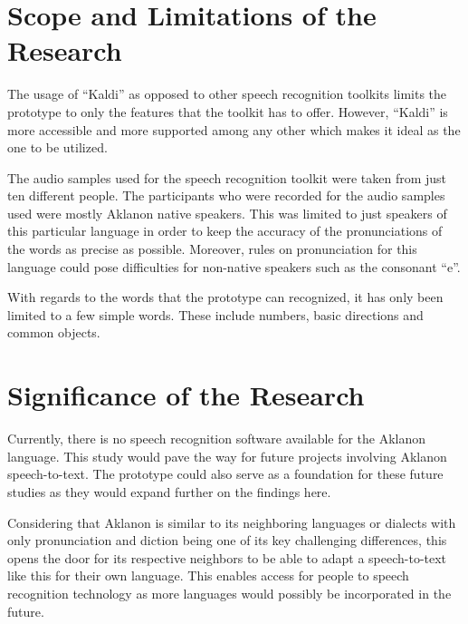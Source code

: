 \section{Scope and Limitations of the Research}

The usage of “Kaldi” as opposed to other speech recognition toolkits limits the prototype to only the features that the toolkit has to offer. However, “Kaldi” is more accessible and more supported among any other which makes it ideal as the one to be utilized.

The audio samples used for the speech recognition toolkit were taken from just ten different people. The participants who were recorded for the audio samples used were mostly Aklanon native speakers. This was limited to just speakers of this particular language in order to keep the accuracy of the pronunciations of the words as precise as possible. Moreover, rules on pronunciation for this language could pose difficulties for non-native speakers such as the consonant “e”. 

With regards to the words that the prototype can recognized, it has only been limited to a few simple words. These include numbers, basic directions and common objects. 

\section{Significance of the Research}

Currently, there is no speech recognition software available for the Aklanon language. This study would pave the way for future projects involving Aklanon speech-to-text. The prototype could also serve as a foundation for these future studies as they would expand further on the findings here. 

Considering that Aklanon is similar to its neighboring languages or dialects with only pronunciation and diction being one of its key challenging differences, this opens the door for its respective neighbors to be able to adapt a speech-to-text like this for their own language. This enables access for people to speech recognition technology as more languages would possibly be incorporated in the future.




